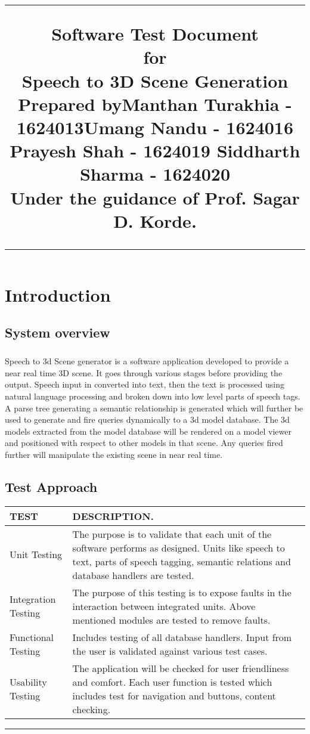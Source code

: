 \documentclass[12pt,a4paper,final,oneside]{report}
\title{%
\flushright
\rule{16cm}{5pt}\vskip1cm
\Huge{Software Test Document }\\
\vspace{0.1cm}
for\\
\vspace{0.1cm}
Speech to 3D Scene Generation\\
\vspace{0.5cm}
Prepared by\linebreak Manthan Turakhia - 1624013\linebreak Umang Nandu - 1624016 \linebreak Prayesh Shah - 1624019 \linebreak Siddharth Sharma - 1624020\\
Under the guidance of \linebreak Prof. Sagar D. Korde.\\
\vfill
\rule{16cm}{5pt}
}
\date{}
\begin{document}
\maketitle
\tableofcontents
\chapter{Introduction}
\section{System overview}
\paragraph{}Speech to 3d Scene generator is a software application developed to provide a near real time 3D scene. It goes through various stages before providing the output. Speech input in converted into text, then the text is processed using natural language processing and broken down into low level parts of speech tags.
	A parse tree generating a semantic relationship is generated which will further be used to generate and fire queries dynamically to a 3d model database. The 3d models extracted from the model database will be rendered on a model viewer and positioned with respect to other models in that scene. Any queries fired further will manipulate the existing scene in near real time.

\section{Test Approach} 

\begin{table}[h!]
  \centering
  \begin{tabular}{|p{3.5cm}|p{10cm}|}
\hline
   TEST& DESCRIPTION.\\
    \hline
    Unit Testing &The purpose is to validate that each unit of the software performs as designed. Units like speech to text, parts of speech tagging, semantic relations and database handlers are tested.\\
    \hline
    Integration Testing &The purpose of this testing is to expose faults in the interaction between integrated units. Above mentioned modules are tested to remove faults.\\

\hline
    Functional Testing  &Includes testing of all database handlers. Input from the user is validated against various test cases.\\
\hline
    Usability Testing &The application will be checked for user friendliness and comfort. Each user function is tested which includes test for navigation and buttons, content checking.\\
 \hline

  \end{tabular}
\end{table}
\rule{16cm}{5pt}
\end{document}
